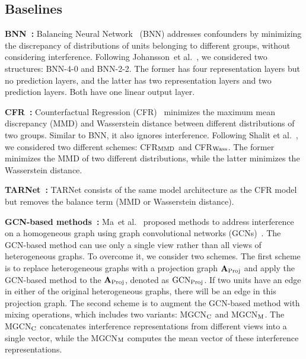 \documentclass[runningheads]{llncs}
\newcommand{\etal}{{et al.}}
\begin{document}
\subsection{Baselines}
\noindent\textbf{BNN~\cite{Johansson2016}:} Balancing Neural Network~\cite{Johansson2016} (BNN) addresses confounders by minimizing the discrepancy of distributions of units belonging to different groups, without considering interference. Following Johansson~\etal~\cite{Johansson2016}, we considered two structures: BNN-4-0 and BNN-2-2. The former has four representation layers but no prediction layers, and the latter has two representation layers and two prediction layers. Both have one linear output layer. 
 
\noindent\textbf{CFR~\cite{pmlr-v70-shalit17a}:} Counterfactual Regression (CFR)~\cite{pmlr-v70-shalit17a} minimizes the maximum mean discrepancy (MMD) and Wasserstein distance between different distributions of two groups. Similar to BNN, it also ignores interference. Following Shalit \etal~\cite{pmlr-v70-shalit17a}, we considered two different schemes:  CFR$_{\rm{MMD}}$ and  CFR$_{\rm{Wass}}$. The former minimizes the MMD of two different distributions, while the latter minimizes the Wasserstein distance.

\noindent\textbf{TARNet~\cite{pmlr-v70-shalit17a}:} TARNet consists of the same model architecture as the CFR model but removes the balance term (MMD or Wasserstein distance).


\noindent\textbf{GCN-based methods~\cite{pmlr-v130-ma21c}:} Ma~\etal~\cite{pmlr-v130-ma21c} proposed methods to address interference on a homogeneous graph using graph convolutional networks (GCNs)~\cite{https://doi.org/10.48550/arxiv.1609.02907}.  The GCN-based method can use only a single view rather than all views of heterogeneous graphs. To overcome it,  we consider two schemes. The first scheme is to replace heterogeneous graphs with a projection graph $\mathbf{A}_{\rm{Proj}}$ and apply the GCN-based method to the $\mathbf{A}_{\rm{Proj}}$, denoted as $\rm{GCN}_{\rm{Proj}}$. If two units have an edge in either of the original heterogeneous graphs, there will be an edge in this projection graph. The second scheme is to augment the GCN-based method with mixing operations, which includes two variants: MGCN$_{\rm{C}}$ and MGCN$_{\rm{M}}$. The MGCN$_{\rm{C}}$ concatenates interference representations from different views into a single vector, while the MGCN$_{\rm{M}}$ computes the mean vector of these interference representations. 

\end{document}
